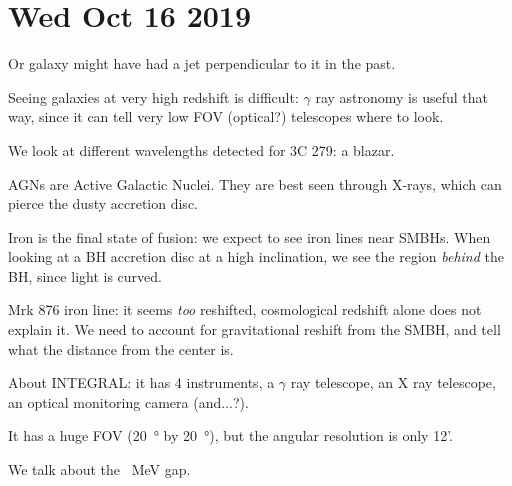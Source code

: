 \documentclass[main.tex]{subfiles}
\begin{document}
\section*{Wed Oct 16 2019}

Or galaxy might have had a jet perpendicular to it in the past.

Seeing galaxies at very high redshift is difficult: \(\gamma \) ray astronomy is useful that way, since it can tell very low FOV (optical?) telescopes where to look.

We look at different wavelengths detected for 3C 279: a blazar.

AGNs are Active Galactic Nuclei. They are best seen through X-rays, which can pierce the dusty accretion disc.

Iron is the final state of fusion: we expect to see iron lines near SMBHs.
When looking at a BH accretion disc at a high inclination, we see the region \emph{behind} the BH, since light is curved.

Mrk 876 iron line: it seems \emph{too} reshifted, cosmological redshift alone does not explain it. We need to account for gravitational reshift from the SMBH, and tell what the distance from the center is.

About INTEGRAL: it has 4 instruments, a \(\gamma \) ray telescope, an X ray telescope, an optical monitoring camera (and...?).

It has a huge FOV (\SI{20}{\degree} by \SI{20}{\degree}), but the angular resolution is only 12'. 

We talk about the \SI{}{MeV} gap.
\end{document}
